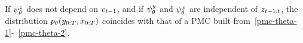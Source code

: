 %
\begin{remark}
  If  $\psi^{z}_{\theta}$ does not depend on ${v}_{t-1}$,
  and if $\psi^{y}_{\theta}$ and $\psi^{x}_{\theta}$ are independent of $z_{t-1:t}$,
  the distribution $p_{\theta}(y_{0:T},x_{0:T})$ coincides with that of a 
  PMC built from~\eqref{pmc-theta-1}-~\eqref{pmc-theta-2}.
\end{remark}

















